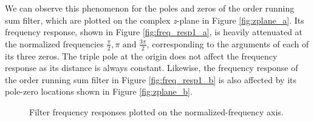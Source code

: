 \documentclass[journal]{IEEEtran}
\begin{document}
We can observe this phenomenon for the poles and zeros of the  order running sum filter, which are plotted on the complex \textit{z}-plane in Figure \ref{fig:zplane_a}. Its frequency response, shown in Figure \ref{fig:freq_resp1_a}, is heavily attenuated at the normalized frequencies $\frac{\pi}{2}, \pi \text{ and } \frac{3 \pi}{2}$, corresponding to the arguments of each of its three zeros. The triple pole at the origin does not affect the frequency response as its distance is always constant. Likewise, the frequency response of the  order running sum filter in Figure \ref{fig:freq_resp1_b} is also affected by its pole-zero locations shown in Figure \ref{fig:zplane_b}. 
\begin{figure}[H]
    \centering
    \captionsetup[subfloat]{farskip=0pt,captionskip=0pt}
    \caption{Filter frequency responses plotted on the normalized-frequency axis.}
    \label{fig:freq_resp1}
\end{figure}
\end{document}
